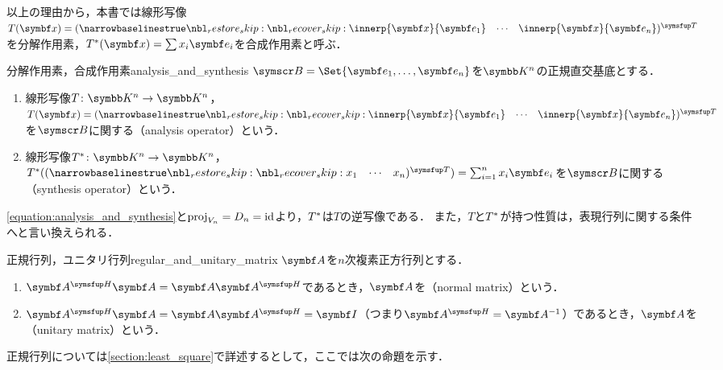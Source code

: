 \documentclass[../../main]{subfiles}
\begin{document}
以上の理由から，本書では線形写像\(T(\vect{x})=\trps{\rowvect{\innerp{\vect{x}}{\vect{e}_1} & \cdots & \innerp{\vect{x}}{\vect{e}_n}}}\)を分解作用素，\(\synth{T}(\vect{x})=\sum x_i\vect{e}_i\)を合成作用素と呼ぶ．

\begin{definition}{分解作用素，合成作用素}{analysis_and_synthesis}
  \(\basis{B}=\Set{\vect{e}_1,\dots,\vect{e}_n}\)を\(\numset{K}^n\)の正規直交基底とする．
  \begin{enumerate}
    \item 線形写像\(T\colon\numset{K}^n\to\numset{K}^n\)，\(T(\vect{x})=\trps{\rowvect{\innerp{\vect{x}}{\vect{e}_1} & \cdots & \innerp{\vect{x}}{\vect{e}_n}}}\)を\(\basis{B}\)に関する（analysis operator）という．
    \item 線形写像\(\synth{T}\colon\numset{K}^n\to\numset{K}^n\)，\(\synth{T}(\trps{\rowvect{x_1 & \cdots & x_n}})=\sum_{i=1}^nx_i\vect{e}_i\)を\(\basis{B}\)に関する（synthesis operator）という．
  \end{enumerate}
\end{definition}

\cref{equation:analysis_and_synthesis}と\(\operatorname{proj}_{V_n}=D_n=\operatorname{id}\)より，\(T^{\mathord{\ast}}\)は\(T\)の逆写像である．
また，\(T\)と\(T^{\mathord{\ast}}\)が持つ性質は，表現行列に関する条件へと言い換えられる．

\begin{definition}{正規行列，ユニタリ行列}{regular_and_unitary_matrix}
  \(\mat{A}\)を\(n\)次複素正方行列とする．
  \begin{enumerate}
    \item \(\htrps{\mat{A}}\mat{A}=\mat{A}\htrps{\mat{A}}\)であるとき，\(\mat{A}\)を（normal matrix）という．
    \item \(\htrps{\mat{A}}\mat{A}=\mat{A}\htrps{\mat{A}}=\imat\)（つまり\(\htrps{\mat{A}}=\mat{A}^{-1}\)）であるとき，\(\mat{A}\)を（unitary matrix）という．
  \end{enumerate}
\end{definition}

正規行列については\cref{section:least_square}で詳述するとして，ここでは次の命題を示す．
\end{document}
